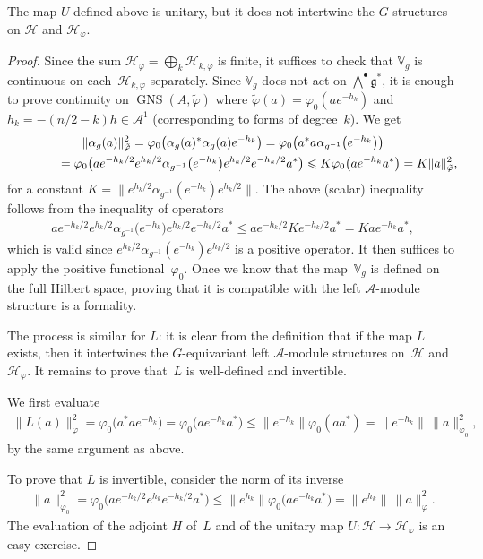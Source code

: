 \documentclass[11pt]{article}
\newcommand{\Aa}{\mathcal{A}}
\newcommand{\Hh}{\mathscr{H}}
\newcommand{\LieG}{\mathfrak{g}}
\newcommand{\RepV}{\mathbb{V}}
\DeclareMathOperator{\GNS}{GNS}
\numberwithin{equation}{section}
\begin{document}
\begin{Remark}
The map $U$ def\/ined above is unitary, but it does not intertwine the $G$-structures on $\Hh$ and $\Hh_\varphi$.
\end{Remark}

\begin{proof}
Since the sum $\Hh_{\varphi} = \bigoplus_k \Hh_{k, \varphi}$ is f\/inite, it suf\/f\/ices to check that $\RepV_g$ is continuous on each~$\Hh_{k, \varphi}$ separately. Since $\RepV_g$ does not act on $\bigwedge^\bullet \LieG^*$, it is enough to prove continuity on $\GNS(A, \tilde{\varphi})$ where $\tilde{\varphi}(a) = \varphi_0(a e^{-h_k})$ and $h_k = -(n/2 -k)h \in \Aa^1$ (corresponding to forms of degree~$k$). We get
\begin{gather*}
\| \alpha_g(a) \|_{\tilde{\varphi}}^2 = \varphi_0\big( \alpha_g(a)^* \alpha_g(a) e^{-h_k} \big) = \varphi_0\big( a^* a \alpha_{g^{-1}}\big(e^{-h_k}\big) \big) \\
\hphantom{\| \alpha_g(a) \|_{\tilde{\varphi}}^2}{}
= \varphi_0\big( a e^{-h_k/2} e^{h_k/2}\alpha_{g^{-1}}\big(e^{-h_k}\big)e^{h_k/2} e^{-h_k/2} a^*\big) \leqslant K \varphi_0\big( a e^{-h_k}a^*\big) = K \| a \|_{\tilde{\varphi}}^2,
\end{gather*}
for a constant $K = \| e^{h_k/2}\alpha_{g^{-1}}(e^{-h_k})e^{h_k/2} \|$. The above (scalar) inequality follows from the inequality of operators
\begin{gather*}
a e^{-h_k/2} e^{h_k/2}\alpha_{g^{-1}}\big(e^{-h_k}\big)e^{h_k/2} e^{-h_k/2} a^* \leqslant a e^{-h_k/2} K e^{-h_k/2} a^* = K a e^{-h_k} a^*,
\end{gather*}
which is valid since $e^{h_k/2}\alpha_{g^{-1}}(e^{-h_k})e^{h_k/2}$ is a positive operator. It then suf\/f\/ices to apply the positive functional~$\varphi_0$. Once we know that the map~$\RepV_g$ is def\/ined on the full Hilbert space, proving that it is compatible with the left $\Aa$-module structure is a formality.

The process is similar for $L$: it is clear from the def\/inition that if the map $L$ exists, then it intertwines the $G$-equivariant left $\Aa$-module structures on~$\Hh$ and~$\Hh_\varphi$. It remains to prove that~$L$ is well-def\/ined and invertible.

We f\/irst evaluate
\begin{gather*}
\| L( a) \|_{\tilde{\varphi}}^2 = \varphi_0\big( a^* a e^{-h_k}\big) = \varphi_0\big( a e^{-h_k} a^*\big) \leqslant \big\| e^{-h_k} \big\| \varphi_0(a a^*) = \big\| e^{-h_k} \big\| \, \| a \|_{\varphi_0}^2,
\end{gather*}
by the same argument as above.

To prove that $L$ is invertible, consider the norm of its inverse
\begin{gather*}
\| a \|_{\varphi_0}^2 = \varphi_0\big( a e^{-h_k/2} e^{h_k} e^{-h_k/2} a^*\big) \leqslant \big\| e^{h_k} \big\| \varphi_0\big( a e^{-h_k} a^*\big) = \big\|e^{h_k} \big\| \, \| a \|_{\tilde{\varphi}}^2.
\end{gather*}
The evaluation of the adjoint $H$ of~$L$ and of the unitary map $U \colon \Hh \to \Hh_\varphi$ is an easy exercise.
\end{proof}
\end{document}
